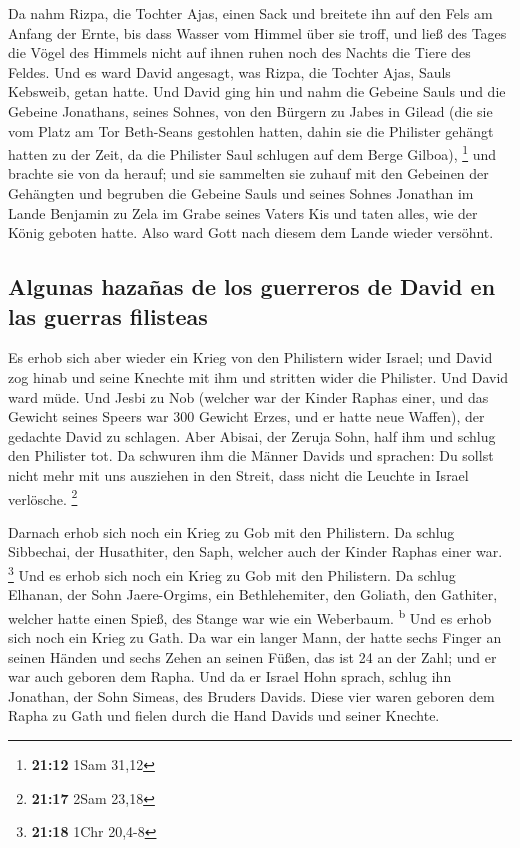 Da nahm Rizpa, die Tochter Ajas, einen Sack und breitete
ihn auf den Fels am Anfang der Ernte, bis dass Wasser vom Himmel über
sie troff, und ließ des Tages die Vögel des Himmels nicht auf ihnen
ruhen noch des Nachts die Tiere des Feldes.  Und es ward
David angesagt, was Rizpa, die Tochter Ajas, Sauls Kebsweib, getan
hatte.  Und David ging hin und nahm die Gebeine Sauls und
die Gebeine Jonathans, seines Sohnes, von den Bürgern zu Jabes in Gilead
(die sie vom Platz am Tor Beth-Seans gestohlen hatten, dahin sie die
Philister gehängt hatten zu der Zeit, da die Philister Saul schlugen auf
dem Berge Gilboa), \footnote{\textbf{21:12} 1Sam 31,12} 
und brachte sie von da herauf; und sie sammelten sie zuhauf mit den
Gebeinen der Gehängten  und begruben die Gebeine Sauls
und seines Sohnes Jonathan im Lande Benjamin zu Zela im Grabe seines
Vaters Kis und taten alles, wie der König geboten hatte. Also ward Gott
nach diesem dem Lande wieder versöhnt.

\hypertarget{algunas-hazauxf1as-de-los-guerreros-de-david-en-las-guerras-filisteas}{%
\subsection{Algunas hazañas de los guerreros de David en las guerras
filisteas}\label{algunas-hazauxf1as-de-los-guerreros-de-david-en-las-guerras-filisteas}}

 Es erhob sich aber wieder ein Krieg von den Philistern
wider Israel; und David zog hinab und seine Knechte mit ihm und stritten
wider die Philister. Und David ward müde.  Und Jesbi zu
Nob (welcher war der Kinder Raphas einer, und das Gewicht seines Speers
war 300 Gewicht Erzes, und er hatte neue Waffen), der gedachte David zu
schlagen.  Aber Abisai, der Zeruja Sohn, half ihm und
schlug den Philister tot. Da schwuren ihm die Männer Davids und
sprachen: Du sollst nicht mehr mit uns ausziehen in den Streit, dass
nicht die Leuchte in Israel verlösche. \footnote{\textbf{21:17} 2Sam
  23,18}

 Darnach erhob sich noch ein Krieg zu Gob mit den
Philistern. Da schlug Sibbechai, der Husathiter, den Saph, welcher auch
der Kinder Raphas einer war. \footnote{\textbf{21:18} 1Chr 20,4-8}
 Und es erhob sich noch ein Krieg zu Gob mit den
Philistern. Da schlug Elhanan, der Sohn Jaere-Orgims, ein Bethlehemiter,
den Goliath, den Gathiter, welcher hatte einen Spieß, des Stange war wie
ein Weberbaum. \textsuperscript{b}  Und es erhob sich
noch ein Krieg zu Gath. Da war ein langer Mann, der hatte sechs Finger
an seinen Händen und sechs Zehen an seinen Füßen, das ist 24 an der
Zahl; und er war auch geboren dem Rapha.  Und da er
Israel Hohn sprach, schlug ihn Jonathan, der Sohn Simeas, des Bruders
Davids.  Diese vier waren geboren dem Rapha zu Gath und
fielen durch die Hand Davids und seiner Knechte.


